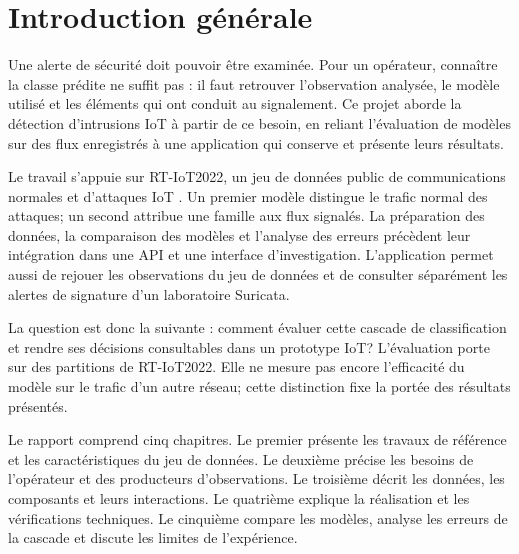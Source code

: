 \chapter*{Introduction générale}

Une alerte de sécurité doit pouvoir être examinée. Pour un opérateur, connaître
la classe prédite ne suffit pas : il faut retrouver l'observation analysée,
le modèle utilisé et les éléments qui ont conduit au signalement. Ce projet
aborde la détection d'intrusions IoT à partir de ce besoin, en reliant
l'évaluation de modèles sur des flux enregistrés à une application
qui conserve et présente leurs résultats.

Le travail s'appuie sur RT-IoT2022, un jeu de données public de communications
normales et d'attaques IoT \citep{b_s_rt-iot2022_2023}. Un premier modèle distingue
le trafic normal des attaques; un second attribue une famille aux flux signalés.
La préparation des données, la comparaison des modèles et l'analyse des erreurs
précèdent leur intégration dans une API et une interface d'investigation.
L'application permet aussi de rejouer les observations du jeu de données et de
consulter séparément les alertes de signature d'un laboratoire Suricata.

La question est donc la suivante : comment évaluer cette cascade de
classification et rendre ses décisions consultables dans un prototype IoT?
L'évaluation porte sur des partitions de RT-IoT2022. Elle ne mesure pas encore
l'efficacité du modèle sur le trafic d'un autre réseau; cette distinction fixe
la portée des résultats présentés.

Le rapport comprend cinq chapitres. Le premier présente les travaux de
référence et les caractéristiques du jeu de données. Le deuxième précise les
besoins de l'opérateur et des producteurs d'observations. Le troisième décrit
les données, les composants et leurs interactions. Le quatrième explique la
réalisation et les vérifications techniques. Le cinquième compare les modèles,
analyse les erreurs de la cascade et discute les limites de l'expérience.
\clearpage
